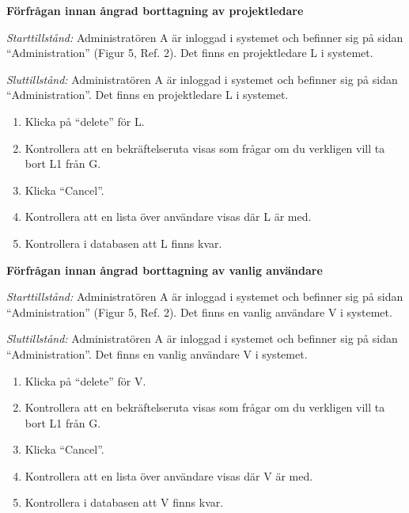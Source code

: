 \documentclass[a4paper]{article}
\begin{document}
\begin{FT}
\item \textbf{Förfrågan innan ångrad borttagning av projektledare}

\emph{Starttillstånd:} Administratören A är inloggad i systemet och befinner sig på sidan ``Administration'' (Figur 5, Ref. 2). Det finns en projektledare L i systemet.

\emph{Sluttillstånd:} Administratören A är inloggad i systemet och befinner sig på sidan ``Administration''. Det finns en projektledare L i systemet.

\begin{enumerate}
\item Klicka på ``delete'' för L.
\item Kontrollera att en bekräftelseruta visas som frågar om du verkligen vill ta bort L1 från G.
\item Klicka ``Cancel''.
\item Kontrollera att en lista över användare visas där L är med.
\item Kontrollera i databasen att L finns kvar.
\end{enumerate}

\item \textbf{Förfrågan innan ångrad borttagning av vanlig användare}

\emph{Starttillstånd:} Administratören A är inloggad i systemet och befinner sig på sidan ``Administration'' (Figur 5, Ref. 2). Det finns en vanlig användare V i systemet.

\emph{Sluttillstånd:} Administratören A är inloggad i systemet och befinner sig på sidan ``Administration''. Det finns en vanlig användare V i systemet.

\begin{enumerate}
\item Klicka på ``delete'' för V.
\item Kontrollera att en bekräftelseruta visas som frågar om du verkligen vill ta bort L1 från G.
\item Klicka ``Cancel''.
\item Kontrollera att en lista över användare visas där V är med.
\item Kontrollera i databasen att V finns kvar.
\end{enumerate}
\end{FT}

\end{document}
